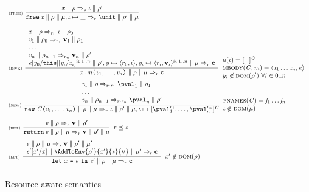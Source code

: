\begin{figure}
\begin{math}
\begin{array}{l}
\NamedRule{free}{
  \RedVal{\x}{\env}{\sgr}{\loc}{\env'}
}{ \reduce{\Conf{\Free\x}{\env}{\mem,\MemElem{\loc}{\_}}}{\rgr}{\Conf{\unit}{\env'}{\mem}} }
{ }

\\[4ex]
\NamedRule{invk}{
\begin{array}{l}
\RedVal{\x}{\env}{\rgr_0}{\loc}{\env_0}\\
\RedVal{\ve_1}{\env_0}{\rgr_1}{\val_1}{\env_1}\\
\ldots\\
\RedVal{\ve_n}{\env_{n-1}}{\rgr_n}{\val_n}{\env'}\\
\reduce{\Conf{\Subst{\Subst{\e}{\y_0}{\this}}{\y_i}{\x_i}^{i\in 1..n}}{\env',\EnvElem{\y}{\rgr_0}{\loc},\EnvElem{\y_i}{\rgr_i}{\val_i}^{i\in 1..n}}{\mem}}{\rgr}{\vconf}
\end{array}
}
{ \reduce{\Conf{\MethCall{\x}{\m}{\ve_1,\ldots,\ve_n}}{\env}{\mem}}{\rgr}{\vconf}}
{\mem(\loc)=\Obj{\C}{\_}\\
\mbody{\C}{\m}=\Pair{\x_1\dots\x_n}{\e}\\
\y_i\not\in\dom{\env'}\ \forall i\in 0..n
}
\\[3ex]

\NamedRule{new}{
\begin{array}{l}
\RedVal{\ve_1}{\env}{\rgr\rmul\rgr_1}{\pval_1}{\env_1}\\
\ldots\\
\RedVal{\ve_n}{\env_{n-1}}{\rgr\rmul\rgr_n}{\pval_n}{\env'}\\
\end{array}}
{ \reduce{\Conf{\New{\C}{\ve_1,\ldots,\ve_n}}{\env}{\mem}}{\rgr}{\Conf{\loc}{\env'}{\mem,\MemElem{\loc}{\Obj{\C}{\GradedValInd{\pval}{1}{\rgr},\ldots,\GradedValInd{\pval}{n}{\rgr}}}}}}
{
  \fnames{\C}=\f_1\ldots\f_n\\
\loc\not\in\dom{\mem}
}

\\[4ex]
\NamedRule{ret}{\RedVal{\ve}{\env}{\sgr}{\val}{\env'}}
{ \reduce{\Conf{\Return\ve}{\env}{\mem}}{\rgr}{\Conf{\val}{\env'}{\mem}} }
{ 
  \rgr\rord\sgr%
}
\\[3ex]
\NamedRule{let}{
 \begin{array}{l}
  \reduce{\Conf{\e}{\env}{\mem}}{\sgr}{\Conf{\val}{\env'}{\mem'}} \\ 
  \reduce{\Conf{\Subst{\e'}{\x'}{\x}}{\AddToEnv{\env'}{\x'}{\sgr}{\val}}{\mem'}}{\rgr}{\vconf}
  \end{array}
}{ \reduce{\Conf{\Let{\x}{\e}{\e'}}{\env}{\mem}}{\rgr}{\vconf} }
{\x'\not\in\dom{\env}}
\\[3ex]
\end{array}
\end{math}
\caption{Resource-aware semantics}
\label{fig:semantics}
\end{figure}

